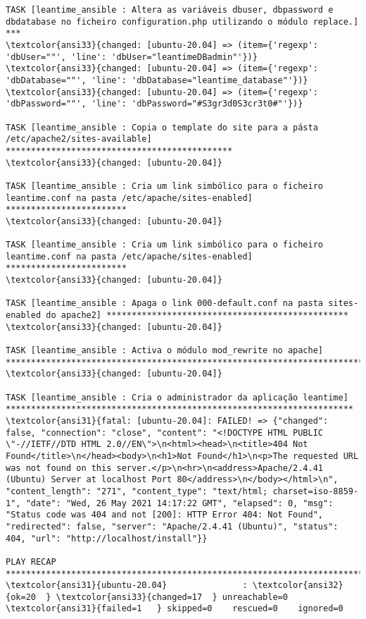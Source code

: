 \documentclass{scrartcl}
\begin{document}
\begin{Verbatim}
TASK [leantime_ansible : Altera as variáveis dbuser, dbpassword e dbdatabase no ficheiro configuration.php utilizando o módulo replace.] ***
\textcolor{ansi33}{changed: [ubuntu-20.04] => (item={'regexp': 'dbUser=""', 'line': 'dbUser="leantimeDBadmin"'})}
\textcolor{ansi33}{changed: [ubuntu-20.04] => (item={'regexp': 'dbDatabase=""', 'line': 'dbDatabase="leantime_database"'})}
\textcolor{ansi33}{changed: [ubuntu-20.04] => (item={'regexp': 'dbPassword=""', 'line': 'dbPassword="#S3gr3d0S3cr3t0#"'})}

TASK [leantime_ansible : Copia o template do site para a pásta /etc/apache2/sites-available] *********************************************
\textcolor{ansi33}{changed: [ubuntu-20.04]}

TASK [leantime_ansible : Cria um link simbólico para o ficheiro leantime.conf na pasta /etc/apache/sites-enabled] ************************
\textcolor{ansi33}{changed: [ubuntu-20.04]}

TASK [leantime_ansible : Cria um link simbólico para o ficheiro leantime.conf na pasta /etc/apache/sites-enabled] ************************
\textcolor{ansi33}{changed: [ubuntu-20.04]}

TASK [leantime_ansible : Apaga o link 000-default.conf na pasta sites-enabled do apache2] ************************************************
\textcolor{ansi33}{changed: [ubuntu-20.04]}

TASK [leantime_ansible : Activa o módulo mod_rewrite no apache] **************************************************************************
\textcolor{ansi33}{changed: [ubuntu-20.04]}

TASK [leantime_ansible : Cria o administrador da aplicação leantime] *********************************************************************
\textcolor{ansi31}{fatal: [ubuntu-20.04]: FAILED! => {"changed": false, "connection": "close", "content": "<!DOCTYPE HTML PUBLIC \"-//IETF//DTD HTML 2.0//EN\">\n<html><head>\n<title>404 Not Found</title>\n</head><body>\n<h1>Not Found</h1>\n<p>The requested URL was not found on this server.</p>\n<hr>\n<address>Apache/2.4.41 (Ubuntu) Server at localhost Port 80</address>\n</body></html>\n", "content_length": "271", "content_type": "text/html; charset=iso-8859-1", "date": "Wed, 26 May 2021 14:17:22 GMT", "elapsed": 0, "msg": "Status code was 404 and not [200]: HTTP Error 404: Not Found", "redirected": false, "server": "Apache/2.4.41 (Ubuntu)", "status": 404, "url": "http://localhost/install"}}

PLAY RECAP *******************************************************************************************************************************
\textcolor{ansi31}{ubuntu-20.04}               : \textcolor{ansi32}{ok=20  } \textcolor{ansi33}{changed=17  } unreachable=0    \textcolor{ansi31}{failed=1   } skipped=0    rescued=0    ignored=0



\end{Verbatim}
\end{document}
